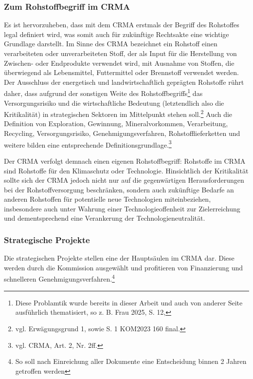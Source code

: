 \documentclass[12pt,a4paper,oneside]{book} %
\begin{document}
\subsubsection{Zum Rohstoffbegriff im CRMA}
Es ist hervorzuheben, dass mit dem CRMA erstmals der Begriff des Rohstoffes legal definiert wird, was somit auch für zukünftige Rechtsakte eine wichtige Grundlage darstellt. Im Sinne des CRMA bezeichnet ein Rohstoff \glqq einen verarbeiteten oder unverarbeiteten Stoff, der als Input für die Herstellung von Zwischen- oder Endprodukte verwendet wird, mit Ausnahme von Stoffen, die überwiegend als Lebensmittel, Futtermittel oder Brennstoff verwendet werden\grqq. Der Ausschluss der energetisch und landwirtschaftlich geprägten Rohstoffe rührt daher, dass aufgrund der sonstigen Weite des Rohstoffbegriffs\footnote{Diese Problamtik wurde bereits in dieser Arbeit und auch von anderer Seite ausführlich thematisiert, so z. B. Frau 2025, S. 12, } das Versorgungsrisiko und die wirtschaftliche Bedeutung (letztendlich also die \glqq Kritikalität\grqq) in strategischen Sektoren im Mittelpunkt stehen soll.\footnote{vgl. Erwägungsgrund 1, sowie S. 1 KOM2023 160 final.}
Auch die Definition von Exploration, Gewinnung, Mineralvorkommen, Verarbeitung, Recycling, Versorgungsrisiko, Genehmigungsverfahren, Rohstofflieferketten und weitere bilden eine entsprechende Definitionsgrundlage.\footnote{vgl. CRMA, Art. 2, Nr. 2ff.}

Der CRMA verfolgt demnach einen eigenen Rohstoffbegriff: Rohstoffe im CRMA sind Rohstoffe für den Klimaschutz oder Technologie.\autocite{Frenz 2025, S. 1065} Hinsichtlich der Kritikalität sollte sich der CRMA jedoch nicht nur auf die gegenwärtigen Herausforderungen bei der Rohstoffversorgung beschränken, sondern auch zukünftige Bedarfe an anderen Rohstoffen für potentielle neue Technologien miteinbeziehen, insbesondere auch unter Wahrung einer Technologieoffenheit zur Zielerreichung und dementsprechend eine Verankerung der Technologieneutralität.\autocite{Frenz 2025, S. 1098}

\subsubsection{Strategische Projekte}
Die strategischen Projekte stellen eine der Hauptsäulen im CRMA dar. Diese werden durch die Kommission ausgewählt und profitieren von Finanzierung und schnelleren Genehmigungsverfahren.\footnote{So soll nach Einreichung aller Dokumente eine Entscheidung binnen 2 Jahren getroffen werden}
\end{document}
